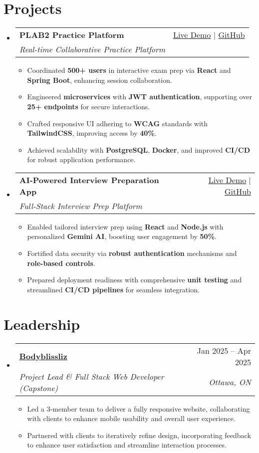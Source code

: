 \documentclass[letterpaper,11pt]{article}
\makeatletter
\newcommand{\resumeItem}[1]{\item\small{#1 \vspace{-2pt}}}
\newcommand{\resumeSubheading}[4]{
  \vspace{-1pt}\item
    \begin{tabular*}{0.97\textwidth}[t]{l@{\extracolsep{\fill}}r}
      \textbf{#1} & #2 \\
      \textit{\small#3} & \textit{\small #4} \\
    \end{tabular*}\vspace{-5pt}
}
\newcommand{\resumeSubHeadingListStart}{\begin{itemize}[leftmargin=*]}
\newcommand{\resumeSubHeadingListEnd}{\end{itemize}}
\newcommand{\resumeItemListStart}{\begin{itemize}}
\newcommand{\resumeItemListEnd}{\end{itemize}\vspace{-5pt}}
\makeatother
\begin{document}
\section{Projects}
  \resumeSubHeadingListStart
    \resumeSubheading
      {\textbf{PLAB2 Practice Platform}}{\href{https://plab2practice.com?utm_source=zapier\&utm_medium=resume\&utm_campaign=job_application}{Live Demo} | \href{https://github.com/altansaid/plab2projectnew}{GitHub}}
      {Real-time Collaborative Practice Platform}{}
      \resumeItemListStart
        \resumeItem{Coordinated \textbf{500+ users} in interactive exam prep via \textbf{React} and \textbf{Spring Boot}, enhancing session collaboration.}
        \resumeItem{Engineered \textbf{microservices} with \textbf{JWT authentication}, supporting over \textbf{25+ endpoints} for secure interactions.}
        \resumeItem{Crafted responsive UI adhering to \textbf{WCAG} standards with \textbf{TailwindCSS}, improving access by \textbf{40\%}.}
        \resumeItem{Achieved scalability with \textbf{PostgreSQL}, \textbf{Docker}, and improved \textbf{CI/CD} for robust application performance.}
      \resumeItemListEnd

    \resumeSubheading
      {\textbf{AI-Powered Interview Preparation App}}{\href{https://interviewcoach-ai.vercel.app}{Live Demo} | \href{https://github.com/altansaid/interviewcoach-ai}{GitHub}}
      {Full-Stack Interview Prep Platform}{}
      \resumeItemListStart
        \resumeItem{Enabled tailored interview prep using \textbf{React} and \textbf{Node.js} with personalized \textbf{Gemini AI}, boosting user engagement by \textbf{50\%}.}
        \resumeItem{Fortified data security via \textbf{robust authentication} mechanisms and \textbf{role-based controls}.}
        \resumeItem{Prepared deployment readiness with comprehensive \textbf{unit testing} and streamlined \textbf{CI/CD pipelines} for seamless integration.}
      \resumeItemListEnd
  \resumeSubHeadingListEnd

\section{Leadership}
  \resumeSubHeadingListStart
    \resumeSubheading
      {\href{https://www.bodyblissliz.com}{Bodyblissliz}}{Jan 2025 -- Apr 2025}
      {Project Lead \& Full Stack Web Developer (Capstone)}{Ottawa, ON}
      \resumeItemListStart
       \resumeItem{Led a 3-member team to deliver a fully responsive website, collaborating with clients to enhance mobile usability
and overall user experience.}
        \resumeItem{Partnered with clients to iteratively refine design, incorporating feedback to enhance user satisfaction and streamline interaction processes.}
      \resumeItemListEnd
  \resumeSubHeadingListEnd
\end{document}
